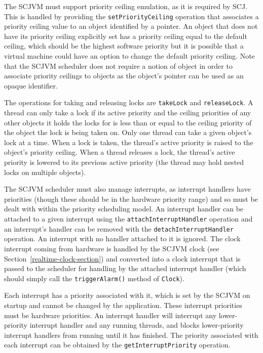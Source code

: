 \documentclass[a4paper,10pt]{report}
\begin{document}
The SCJVM must support priority ceiling emulation, as it is required by
SCJ. This is handled by providing the \texttt{set\-Priority\-Ceiling} operation
that associates a priority ceiling value to an object identified by a
pointer. An object that does not have its priority ceiling explicitly set has a
priority ceiling equal to the default ceiling, which should be the highest
software priority but it is possible that a virtual machine could have an option
to change the default priority ceiling. Note that the SCJVM scheduler does not
require a notion of object in order to associate priority ceilings to objects as
the object's pointer can be used as an opaque identifier.

The operations for taking and releasing locks are \texttt{takeLock} and
\texttt{releaseLock}. A thread can only take a lock if its active priority and
the ceiling priorities of any other objects it holds the locks for is less than
or equal to the ceiling priority of the object the lock is being taken on. Only
one thread can take a given object's lock at a time. When a lock is taken, the
thread's active priority is raised to the object's priority ceiling. When a
thread releases a lock, the thread's active priority is lowered to its previous
active priority (the thread may hold nested locks on multiple objects).

The SCJVM scheduler must also manage interrupts, as interrupt handlers have
priorities (though these should be in the hardware priority range) and so must
be dealt with within the priority scheduling model. An interrupt handler can be
attached to a given interrupt using the \texttt{attach\-Interrupt\-Handler}
operation and an interrupt's handler can be removed with the
\texttt{detach\-Interrupt\-Handler} operation. An interrupt with no handler
attached to it is ignored. The clock interrupt coming from hardware is handled
by the SCJVM clock (see Section~\ref{realtime-clock-section}) and converted into
a clock interrupt that is passed to the scheduler for handling by the attached
interrupt handler (which should simply call the \texttt{triggerAlarm()} method
of \texttt{Clock}).

Each interrupt has a priority associated with it, which is set by the SCJVM on
startup and cannot be changed by the application. These interrupt priorities
must be hardware priorities. An interrupt handler will interrupt any
lower-priority interrupt handler and any running threads, and blocks
lower-priority interrupt handlers from running until it has finished. The
priority associated with each interrupt can be obtained by the
\texttt{get\-Interrupt\-Priority} operation.
\end{document}

